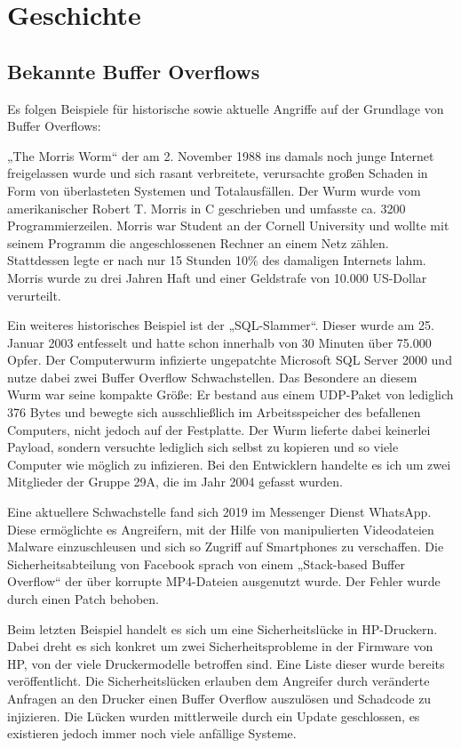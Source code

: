 \section{Geschichte}
\subsection{Bekannte Buffer Overflows}
Es folgen Beispiele für historische sowie aktuelle Angriffe auf der Grundlage von Buffer Overflows:

„The Morris Worm“ der am 2. November 1988 ins damals noch junge Internet freigelassen wurde und sich rasant verbreitete,
verursachte großen Schaden in Form von überlasteten Systemen und Totalausfällen. Der Wurm wurde vom amerikanischer Robert T. Morris in C geschrieben
und umfasste ca. 3200 Programmierzeilen. Morris war Student an der Cornell University und wollte mit seinem Programm die angeschlossenen Rechner an einem Netz zählen.
Stattdessen legte er nach nur 15 Stunden 10\% des damaligen Internets lahm. Morris wurde zu drei Jahren Haft und einer Geldstrafe von 10.000 US-Dollar verurteilt. \cite{wiki1}

Ein weiteres historisches Beispiel ist der „SQL-Slammer“. Dieser wurde am 25. Januar 2003 entfesselt und hatte schon innerhalb von 30 Minuten über 75.000 Opfer.
Der Computerwurm infizierte ungepatchte Microsoft SQL Server 2000 und nutze dabei zwei Buffer Overflow Schwachstellen.
Das Besondere an diesem Wurm war seine kompakte Größe: Er bestand aus einem UDP-Paket von lediglich 376 Bytes und bewegte sich ausschließlich im Arbeitsspeicher des befallenen
Computers, nicht jedoch auf der Festplatte. Der Wurm lieferte dabei keinerlei Payload, sondern versuchte lediglich sich selbst zu kopieren und
so viele Computer wie möglich zu infizieren. Bei den Entwicklern handelte es ich um zwei Mitglieder der Gruppe 29A, die im Jahr 2004 gefasst wurden. \cite{wiki2}

Eine aktuellere Schwachstelle fand sich 2019 im Messenger Dienst WhatsApp. Diese ermöglichte es Angreifern,
mit der Hilfe von manipulierten Videodateien Malware einzuschleusen und sich so Zugriff auf Smartphones zu verschaffen.
Die Sicherheitsabteilung von Facebook sprach von einem „Stack-based Buffer Overflow“ der über korrupte MP4-Dateien ausgenutzt wurde.
Der Fehler wurde durch einen Patch behoben. \cite{whatsapp1}

Beim letzten Beispiel handelt es sich um eine Sicherheitslücke in HP-Druckern.
Dabei dreht es sich konkret um zwei Sicherheitsprobleme in der Firmware von HP, von der viele Druckermodelle betroffen sind.
Eine Liste dieser wurde bereits veröffentlicht. Die Sicherheitslücken erlauben dem Angreifer durch veränderte Anfragen an den Drucker einen Buffer Overflow auszulösen
und Schadcode zu injizieren. Die Lücken wurden mittlerweile durch ein Update geschlossen, es existieren jedoch immer noch viele anfällige Systeme. \cite{hpvuln}
